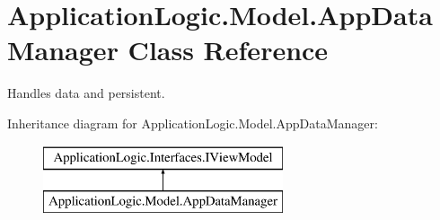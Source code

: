 \hypertarget{class_application_logic_1_1_model_1_1_app_data_manager}{
\section{ApplicationLogic.Model.AppDataManager Class Reference}
\label{class_application_logic_1_1_model_1_1_app_data_manager}
}


Handles data and persistent.  


Inheritance diagram for ApplicationLogic.Model.AppDataManager:\begin{figure}[H]
\begin{center}
\leavevmode
\includegraphics[height=2.000000cm]{class_application_logic_1_1_model_1_1_app_data_manager}
\end{center}
\end{figure}
